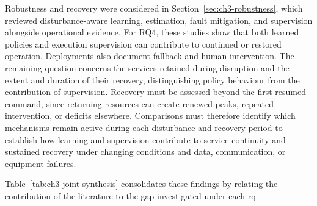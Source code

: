 Robustness and recovery were considered in Section~\ref{sec:ch3-robustness}, which reviewed disturbance-aware learning, estimation, fault mitigation, and supervision alongside operational evidence. For RQ4, these studies show that both learned policies and execution supervision can contribute to continued or restored operation. Deployments also document fallback and human intervention. The remaining question concerns the services retained during disruption and the extent and duration of their recovery, distinguishing policy behaviour from the contribution of supervision. Recovery must be assessed beyond the first resumed command, since returning resources can create renewed peaks, repeated intervention, or deficits elsewhere. Comparisons must therefore identify which mechanisms remain active during each disturbance and recovery period to establish how learning and supervision contribute to service continuity and sustained recovery under changing conditions and data, communication, or equipment failures.

Table~\ref{tab:ch3-joint-synthesis} consolidates these findings by relating the contribution of the literature to the gap investigated under each \gls{rq}.

